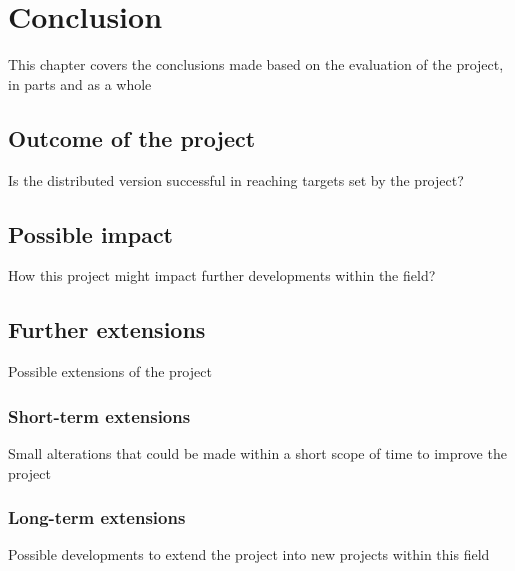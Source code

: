 \chapter{Conclusion}

This chapter covers the conclusions made based on the evaluation of the project, in parts and as a whole

\section{Outcome of the project}

Is the distributed version successful in reaching targets set by the project?

\section{Possible impact}

How this project might impact further developments within the field?

\section{Further extensions}

Possible extensions of the project

\subsection{Short-term extensions}

Small alterations that could be made within a short scope of time to improve the project

\subsection{Long-term extensions}

Possible developments to extend the project into new projects within this field
